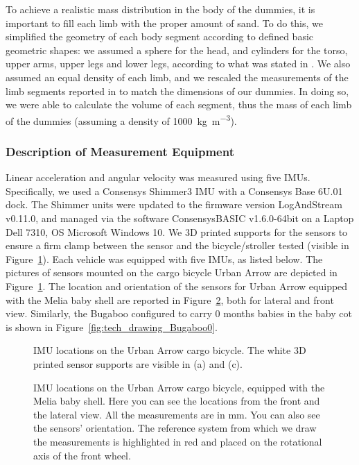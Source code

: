 \documentclass[a4paper]{article}
\begin{document}
To achieve a realistic mass distribution in the body of the dummies, it is
important to fill each limb with the proper amount of sand. To do this, we
simplified the geometry of each body segment according to defined basic
geometric shapes: we assumed a sphere for the head, and cylinders for the torso,
upper arms, upper legs and lower legs, according to what was stated in
\cite{Snyder1977}. We also assumed an equal density of each limb, and we
rescaled the measurements of the limb segments reported in \cite{Snyder1977} to
match the dimensions of our dummies. In doing so, we were able to calculate the
volume of each segment, thus the mass of each limb of the dummies (assuming a
density of 1000~\si{\kg\per\cubic\meter}).

\subsubsection{Description of Measurement Equipment}
%
Linear acceleration and angular velocity was measured using five IMUs.
Specifically, we used a Consensys Shimmer3 IMU with a Consensys Base 6U.01 dock.
The Shimmer units were updated to the firmware version LogAndStream v0.11.0, and
managed via the software ConsensysBASIC v1.6.0-64bit on a Laptop Dell 7310, OS
Microsoft Windows 10. We 3D printed supports for the sensors to ensure a firm
clamp between the sensor and the bicycle/stroller tested (visible in
Figure~\ref{fig:sensors_UA}). Each vehicle was equipped with five IMUs, as
listed below. The pictures of sensors mounted on the cargo bicycle Urban Arrow
are depicted in Figure~\ref{fig:sensors_UA}. The location and orientation of the
sensors for Urban Arrow equipped with the Melia baby shell are reported in
Figure~\ref{fig:tech_drawing_UA_Melia}, both for lateral and front view.
Similarly, the Bugaboo configured to carry 0 months babies in the baby cot is
shown in Figure~\ref{fig:tech_drawing_Bugaboo0}.
%
\begin{figure}
  \centering
  \caption{IMU locations on the Urban Arrow cargo bicycle. The white 3D printed
  sensor supports are visible in (a) and (c).}
  \label{fig:sensors_UA}
\end{figure}
%
\begin{figure}
  \centering
  \caption{IMU locations on the Urban Arrow cargo bicycle, equipped with the
  Melia baby shell. Here you can see the locations from the front and the
  lateral view. All the measurements are in \si{\mm}. You can also see the
  sensors' orientation. The reference system from which we draw the measurements
  is highlighted in red and placed on the rotational axis of the front wheel.}
  \label{fig:tech_drawing_UA_Melia}
\end{figure}
\end{document}
